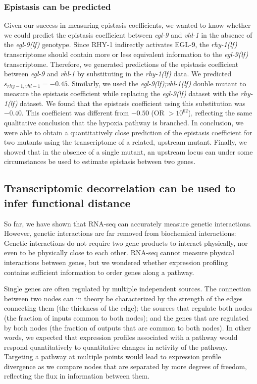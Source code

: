 \documentclass[9pt,twocolumn,twoside,lineno]{pnas-new}
\newcommand{\gene}[1]{\emph{#1}}
\newcommand{\egl}{\emph{\mbox{egl-9}(lf)}}
\newcommand{\rhy}{\emph{\mbox{rhy-1}(lf)}}
\newcommand{\eglvhl}{\emph{\mbox{egl-9(lf);vhl-1(lf)}}}
\newcommand{\eglp}{EGL-9}
\newcommand{\rhyp}{RHY-1}
\begin{document}
\subsubsection*{Epistasis can be predicted}
Given our success in measuring epistasis coefficients, we wanted to know whether
we could predict the epistasis coefficient between \gene{egl-9} and \gene{vhl-1}
in the absence of the \egl{} genotype. Since \rhyp{} indirectly activates
\eglp{}, the \rhy{} transcriptome should contain more or less equivalent
information to the \egl{} transcriptome. Therefore, we generated predictions of
the epistasis coefficient between \gene{egl-9} and \gene{vhl-1} by substituting
in the \rhy{} data. We predicted $s_{rhy-1,vhl-1} = -0.45$. Similarly, we used
the \eglvhl{} double mutant to measure the epistasis coefficient while replacing
the \egl{} dataset with the \rhy{} dataset. We found that the epistasis
coefficient using this substitution was $-0.40$. This coefficient was different
from $-0.50$ (OR $>10^{62}$), reflecting the same qualitative conclusion that
the hypoxia pathway is branched. In conclusion, we were able to obtain a
quantitatively close prediction of the epistasis coefficient for two mutants
using the transcriptome of a related, upstream mutant. Finally, we showed that
in the absence of a single mutant, an upstream locus can under some circumstances
be used to estimate epistasis between two genes.

\subsection*{Transcriptomic decorrelation can be used to infer functional distance}
\label{sub:decorrelation}
So far, we have shown that RNA-seq can accurately measure genetic interactions.
However, genetic interactions are far removed from biochemical interactions:
Genetic interactions do not require two gene products to interact physically, nor
even to be physically close to each other. RNA-seq cannot measure physical
interactions between genes, but we wondered whether expression profiling contains
sufficient information to order genes along a pathway.

Single
genes are often regulated by multiple independent sources. The connection between
two nodes can in theory be characterized by the strength of the edges connecting
them (the thickness of the edge); the sources that regulate both nodes (the
fraction of inputs common to both nodes); and the genes that are regulated by
both nodes (the fraction of outputs that are common to both nodes). In other
words, we expected that expression profiles associated with a pathway would
respond quantitatively to quantitative changes in activity of the pathway.
Targeting a pathway at multiple points would lead to expression profile
divergence as we compare nodes that are separated by more degrees of freedom,
reflecting the flux in information between them.
\end{document}
